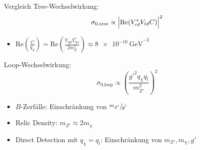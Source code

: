 \begin{frame}{Vergleich}
Tree-Wechselwirkung:
	\[ \sigma_\text{0,tree} \propto \Bigl|\text{Re}(V_{cd}^*V_{td}C)\Bigr|^2 \]
\begin{itemize}
	\item $\text{Re}\left(\frac{C}{q_\chi}\right) = \text{Re}\left(\frac{Y_{Qb}Y_{Qs}^*}{2m_Q^2}\right)\approx\SI{8e-10}{\giga\electronvolt}^{-2}$
\end{itemize}
Loop-Wechselwirkung:
	\[ \sigma_\text{0,loop} \propto \left(\frac{g'^2q_\chi q_l}{m_{Z'}^2}\right)^2 \]
\begin{itemize}
	\item $B$-Zerfälle: Einschränkung von $\sfrac{m_{Z'}}{g'}$
	\item Relic Density: $m_{Z'}\approx 2m_\chi$
	\item Direct Detection mit $q_\chi=q_l$: Einschränkung von $m_{Z'},m_\chi,g'$
\end{itemize}
\end{frame}


